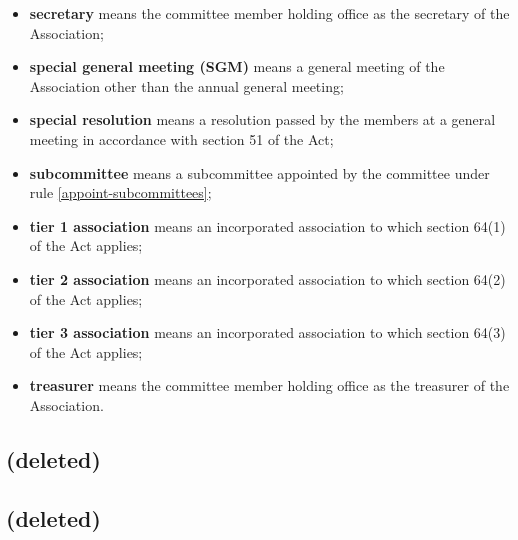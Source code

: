 \documentclass[../constitution.tex]{subfiles}
\begin{document}
\begin{itemize}[label={-}]
\item \textbf{secretary} means the committee member holding office as the secretary of the Association;
\item \textbf{special general meeting (SGM)} means a general meeting of the Association other than the annual general meeting;
\item \textbf{special resolution} means a resolution passed by the members at a general meeting in accordance with section 51 of the Act;
\item \textbf{subcommittee} means a subcommittee appointed by the committee under rule \ref{appoint-subcommittees};
\item \textbf{tier 1 association} means an incorporated association to which section 64(1) of the Act applies;
\item \textbf{tier 2 association} means an incorporated association to which section 64(2) of the Act applies;
\item \textbf{tier 3 association} means an incorporated association to which section 64(3) of the Act applies;
\item \textbf{treasurer} means the committee member holding office as the treasurer of the Association.
\end{itemize}


\subsection{(deleted)}


\subsection{(deleted)}
\end{document}

